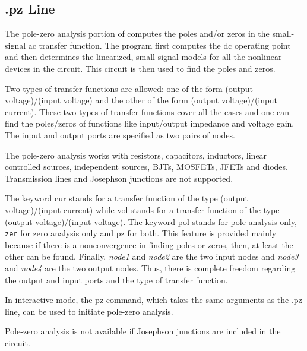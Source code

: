 \subsection{{\vt .pz} Line}
\label{pzline}


The pole-zero analysis portion of {\WRspice} computes the poles
and/or zeros in the small-signal ac transfer function.  The program
first computes the dc operating point and then determines the
linearized, small-signal models for all the nonlinear devices in the
circuit.  This circuit is then used to find the poles and zeros.

Two types of transfer functions are allowed:  one of the form (output
voltage)/(input voltage) and the other of the form (output
voltage)/(input current).  These two types of transfer functions cover
all the cases and one can find the poles/zeros of functions like
input/output impedance and voltage gain.  The input and output ports
are specified as two pairs of nodes.

The pole-zero analysis works with resistors, capacitors, inductors,
linear controlled sources, independent sources, BJTs, MOSFETs, JFETs
and diodes.  Transmission lines and Josephson junctions are not
supported.


The keyword {\vt cur} stands for a transfer function of the type
(output voltage)/(input current) while {\vt vol} stands for a transfer
function of the type (output voltage)/(input voltage).  The keyword
{\vt pol} stands for pole analysis only, {\tt zer} for zero analysis
only and {\vt pz} for both.  This feature is provided mainly because
if there is a nonconvergence in finding poles or zeros, then, at least
the other can be found.  Finally, {\it node1\/} and {\it node2\/} are
the two input nodes and {\it node3\/} and {\it node4\/} are the two
output nodes.  Thus, there is complete freedom regarding the output
and input ports and the type of transfer function.

In interactive mode, the {\cb pz} command, which takes the same
arguments as the {\vt .pz} line, can be used to initiate pole-zero
analysis.

Pole-zero analysis is not available if Josephson junctions are
included in the circuit.

